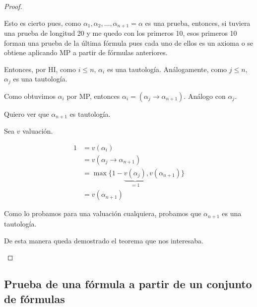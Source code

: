 \begin{proof}
\begin{enumerate}
            Esto es cierto pues, como 
            $\alpha_1, \alpha_2, \dotsc, \alpha_{n+1}=\alpha$ es una
            prueba, entonces, si tuviera una prueba de longitud 20 y me
            quedo con los primeros 10, esos primeros 10 forman una prueba de
            la última fórmula pues cada uno de ellos es un axioma o se obtiene
            aplicando MP a partir de fórmulas anteriores.

            Entonces, por HI, como $i \leq n$, $\alpha_i$ es una tautología.
            Análogamente, como $j \leq n$, $\alpha_j$ es una tautología.

            Como obtuvimos $\alpha_i$ por MP, entonces 
            $\alpha_i = (\alpha_j \to \alpha_{n+1})$.
            Análogo con $\alpha_j$.

            Quiero ver que $\alpha_{n+1}$ es tautología.

            Sea $v$ valuación.

            \begin{align*}
                1 &= v(\alpha_i) \\
                  &= v(\alpha_j \to \alpha_{n+1}) \\
                  &= \max \{ 1- \underbrace{v(\alpha_j)}_{=1}, 
                  v(\alpha_{n+1}) \} \\
                  &= v(\alpha_{n+1})
            \end{align*}

            Como lo probamos para una valuación cualquiera, probamos que
            $\alpha_{n+1}$ es una tautología.

            De esta manera queda demostrado el teorema que nos interesaba.
    \end{enumerate}
\end{proof}


\subsection{Prueba de una fórmula a partir de un conjunto de fórmulas}
 
